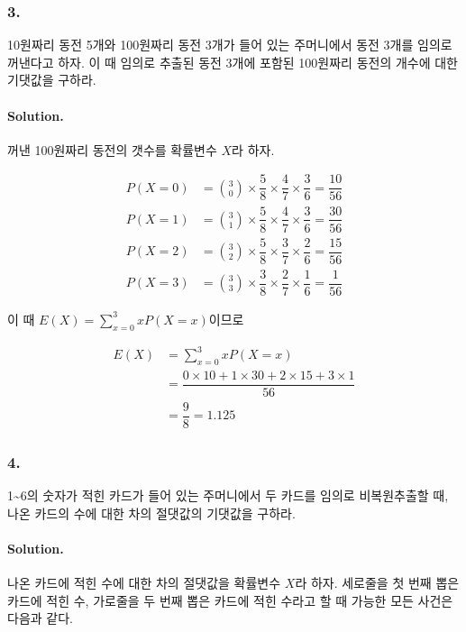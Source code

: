 \subsubsection{3.} 10원짜리 동전 5개와 100원짜리 동전 3개가 들어 있는 주머니에서 동전 3개를 임의로 꺼낸다고 하자. 이 때 임의로 추출된 동전 3개에 포함된 100원짜리 동전의 개수에 대한 기댓값을 구하라.

\paragraph{Solution.} 꺼낸 100원짜리 동전의 갯수를 확률변수 $X$라 하자.

\begin{align*}
	P\left(X=0\right) &= \binom{3}{0} \times \dfrac{5}{8} \times \dfrac{4}{7} \times \dfrac{3}{6} = \dfrac{10}{56}\\
	P\left(X=1\right) &= \binom{3}{1} \times \dfrac{5}{8} \times \dfrac{4}{7} \times \dfrac{3}{6} = \dfrac{30}{56}\\
	P\left(X=2\right) &= \binom{3}{2} \times \dfrac{5}{8} \times \dfrac{3}{7} \times \dfrac{2}{6} = \dfrac{15}{56}\\
	P\left(X=3\right) &= \binom{3}{3} \times \dfrac{3}{8} \times \dfrac{2}{7} \times \dfrac{1}{6} = \dfrac{1}{56}
\end{align*}

이 때 $\displaystyle E\left(X\right) = \sum_{x = 0}^3 xP\left(X = x\right)$이므로

\begin{align*}
	E\left(X\right) &= \sum_{x = 0}^3 xP\left(X = x\right)\\
	&= \dfrac{0\times 10+1\times 30+2\times 15+3\times 1}{56}\\
	&= \dfrac{9}{8} = 1.125
\end{align*}

\subsubsection{4.} 1\textasciitilde6의 숫자가 적힌 카드가 들어 있는 주머니에서 두 카드를 임의로 비복원추출할 때, 나온 카드의 수에 대한 차의 절댓값의 기댓값을 구하라.

\paragraph{Solution.} 나온 카드에 적힌 수에 대한 차의 절댓값을 확률변수 $X$라 하자. 세로줄을 첫 번째 뽑은 카드에 적힌 수, 가로줄을 두 번째 뽑은 카드에 적힌 수라고 할 때 가능한 모든 사건은 다음과 같다.

